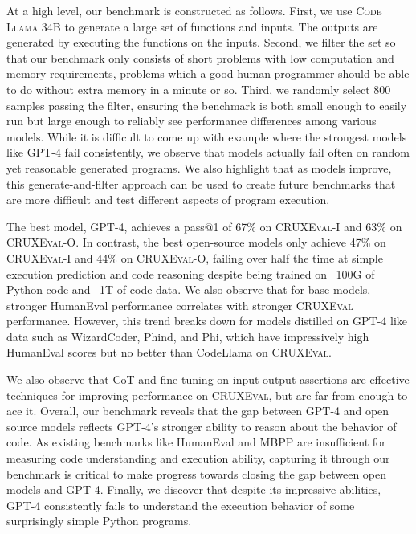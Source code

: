 \documentclass{article} %
\newcommand{\benchmark}{\textsc{CRUXEval}\xspace}
\newcommand{\benchmarki}{\textsc{CRUXEval-I}\xspace}
\newcommand{\benchmarko}{\textsc{CRUXEval-O}\xspace}
\newcommand{\codellamalarge}{\textsc{Code Llama 34B}\xspace}
\begin{document}
At a high level, our benchmark is constructed as follows. First, we use \codellamalarge to generate a large set of functions and inputs. The outputs are generated by executing the functions on the inputs. Second, we filter the set so that our benchmark only consists of short problems with low computation and memory requirements, problems which a good human programmer should be able to do without extra memory in a minute or so. Third, we randomly select 800 samples passing the filter, ensuring the benchmark is both small enough to easily run but large enough to reliably see performance differences among various models. While it is difficult to come up with example where the strongest models like GPT-4 fail consistently, we observe that models actually fail often on random yet reasonable generated programs. We also highlight that as models improve, this generate-and-filter approach can be used to create future benchmarks that are more difficult and test different aspects of program execution.

The best model, GPT-4, achieves a pass@1 of 67\% on \benchmarki and 63\% on \benchmarko. In contrast, the best open-source models only achieve 47\% on \benchmarki and 44\% on \benchmarko, failing over half the time at simple execution prediction and code reasoning despite being trained on ~100G of Python code and ~1T of code data. We also observe that for base models, stronger HumanEval performance correlates with stronger \benchmark performance. However, this trend breaks down for models distilled on GPT-4 like data such as WizardCoder, Phind, and Phi, which have impressively high HumanEval scores but no better than CodeLlama on \benchmark.

We also observe that CoT and fine-tuning on input-output assertions are effective techniques for improving performance on \benchmark, but are far from enough to ace it. Overall, our benchmark reveals that the gap between GPT-4 and open source models reflects GPT-4's stronger ability to reason about the behavior of code. As existing benchmarks like HumanEval and MBPP are insufficient for measuring code understanding and execution ability, capturing it through our benchmark is critical to make progress towards closing the gap between open models and GPT-4. Finally, we discover that despite its impressive abilities, GPT-4 consistently fails to understand the execution behavior of some surprisingly simple Python programs. 


%
\end{document}
